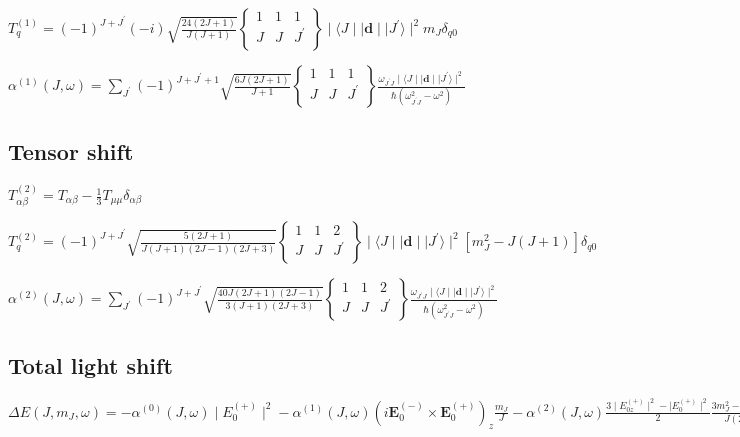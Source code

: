 \documentclass{article}
\begin{document}
$T_{q}^{(1)} = (-1)^{J + J^{'}}(-i) \sqrt{\frac{24(2J + 1)}{J(J+1)}} \begin{Bmatrix} 1 & 1 & 1 \\ J & J  & J^{'} \\ \end{Bmatrix} \mid \langle J \mid\mid \textbf{d} \mid \mid J^{'} \rangle \mid^2 m_J \delta_{q0}$

$\alpha^{(1)}(J, \omega) = \sum_{J^{'}}(-1)^{J + J^{'} + 1} \sqrt{\frac{6J(2J + 1)}{J+1}} \begin{Bmatrix} 1 & 1 & 1 \\ J & J  & J^{'} \\ \end{Bmatrix}  \frac{ \omega_{J^{'} J} \mid \langle J \mid\mid \textbf{d} \mid \mid J^{'} \rangle \mid^2}{\hbar (\omega_{J^{'} J}^2 - \omega^2)}$

    \subsection{Tensor shift}\label{tensor-shift}

$T_{\alpha \beta}^{(2)} = T_{\alpha \beta} - \frac{1}{3} T_{\mu \mu} \delta_{\alpha \beta}$

$T_{q}^{(2)} = (-1)^{J + J^{'}} \sqrt{\frac{5(2J + 1)}{J(J+1)(2J-1)(2J+3)}} \begin{Bmatrix} 1 & 1 & 2 \\ J & J  & J^{'} \\ \end{Bmatrix} \mid \langle J \mid\mid \textbf{d} \mid \mid J^{'} \rangle \mid^2 [m_J^2-J(J+1)] \delta_{q0}$

$\alpha^{(2)}(J, \omega) = \sum_{J^{'}}(-1)^{J + J^{'}} \sqrt{\frac{40J(2J + 1)(2J-1)}{3(J+1)(2J+3)}} \begin{Bmatrix} 1 & 1 & 2 \\ J & J  & J^{'} \\ \end{Bmatrix}  \frac{ \omega_{J^{'} J} \mid \langle J \mid\mid \textbf{d} \mid \mid J^{'} \rangle \mid^2}{\hbar (\omega_{J^{'} J}^2 - \omega^2)}$

    \subsection{Total light shift}\label{total-light-shift}

    $\Delta E(J, m_J, \omega) = -\alpha^{(0)}(J, \omega) \mid E_0^{(+)} \mid^2 -\alpha^{(1)}(J, \omega)(i \textbf{E}_0^{(-)} \times \textbf{E}_0^{(+)})_z \frac{m_J}{J} - \alpha^{(2)}(J, \omega) \frac{3 \mid E_{0z}^{(+)} \mid^2 - \mid E_0^{(+)} \mid^2}{2} \frac{3 m_J^2 - J(J+1)}{J(2J-1)}$
\end{document}

